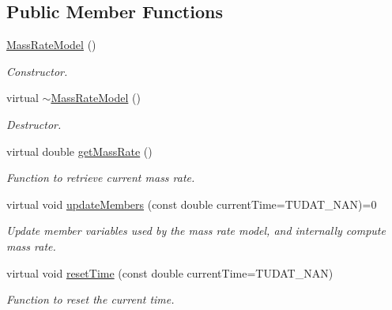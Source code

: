 \subsection*{Public Member Functions}
\begin{DoxyCompactItemize}
\item 
\hyperlink{classtudat_1_1basic__astrodynamics_1_1MassRateModel_a1683d8d274ad04b9cb92abbf8d2f7773}{Mass\+Rate\+Model} ()\hypertarget{classtudat_1_1basic__astrodynamics_1_1MassRateModel_a1683d8d274ad04b9cb92abbf8d2f7773}{}\label{classtudat_1_1basic__astrodynamics_1_1MassRateModel_a1683d8d274ad04b9cb92abbf8d2f7773}

\begin{DoxyCompactList}\small\item\em Constructor. \end{DoxyCompactList}\item 
virtual \hyperlink{classtudat_1_1basic__astrodynamics_1_1MassRateModel_ab1417a088fd41b31e1709f316f7bbfc6}{$\sim$\+Mass\+Rate\+Model} ()\hypertarget{classtudat_1_1basic__astrodynamics_1_1MassRateModel_ab1417a088fd41b31e1709f316f7bbfc6}{}\label{classtudat_1_1basic__astrodynamics_1_1MassRateModel_ab1417a088fd41b31e1709f316f7bbfc6}

\begin{DoxyCompactList}\small\item\em Destructor. \end{DoxyCompactList}\item 
virtual double \hyperlink{classtudat_1_1basic__astrodynamics_1_1MassRateModel_aae103a96511649566f7bce8417a2f049}{get\+Mass\+Rate} ()
\begin{DoxyCompactList}\small\item\em Function to retrieve current mass rate. \end{DoxyCompactList}\item 
virtual void \hyperlink{classtudat_1_1basic__astrodynamics_1_1MassRateModel_a73c723ea252c57f3ac3109bb4c1bed42}{update\+Members} (const double current\+Time=T\+U\+D\+A\+T\+\_\+\+N\+AN)=0
\begin{DoxyCompactList}\small\item\em Update member variables used by the mass rate model, and internally compute mass rate. \end{DoxyCompactList}\item 
virtual void \hyperlink{classtudat_1_1basic__astrodynamics_1_1MassRateModel_a40eab52663ad3e184899354596d0dbca}{reset\+Time} (const double current\+Time=T\+U\+D\+A\+T\+\_\+\+N\+AN)
\begin{DoxyCompactList}\small\item\em Function to reset the current time. \end{DoxyCompactList}\end{DoxyCompactItemize}
